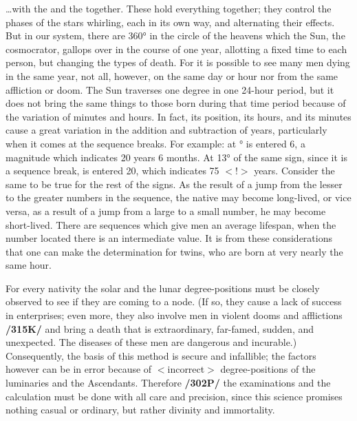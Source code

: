 …with the \Sun\xspace and the \Moon\xspace together. These hold everything together; they control the phases of the stars whirling, each in its own way, and alternating their effects. But in our system, there are 360° in the circle of the heavens which the Sun, the cosmocrator, gallops over in the course of one year, allotting a fixed
time to each person, but changing the types of death. For it is possible to see many men dying in the same year, not all, however, on the same day or hour nor from the same affliction or doom. The Sun traverses one degree in one 24-hour period, but it does not bring the same things to those born during that time period because of the variation of minutes and hours. In fact, its position, its hours, and its minutes cause a great variation in the addition and subtraction of years, particularly when it comes at the sequence breaks. For example: at \Leo\xspace 12° is entered 6, a magnitude which indicates 20 years 6 months. At 13° of the same sign, since it is a sequence break, is entered 20, which indicates 75 $<$!$>$ years. Consider the same to be true for the rest of the signs. As the result of a jump from the lesser to the greater numbers in the sequence, the native may become long-lived, or vice versa, as a result of a jump from a large to a small number, he may become short-lived. There are sequences which give men an average lifespan, when the number located there is an intermediate value. It is from these considerations that one can make the determination for twins, who are born at very nearly the same hour.

For every nativity the solar and the lunar degree-positions must be closely observed to see if they are coming to a node. (If so, they cause a lack of success in enterprises; even more, they also involve men in violent dooms and afflictions \textbf{/315K/} and bring a death that is extraordinary, far-famed, sudden, and unexpected. The diseases of these men are dangerous and incurable.) Consequently, the basis of this method is secure and infallible; the factors however can be in error because of $<$incorrect$>$ degree-positions of the luminaries and the Ascendants. Therefore \textbf{/302P/} the examinations and the calculation must be done with all care and precision, since this science promises nothing casual or ordinary, but rather divinity and immortality.

